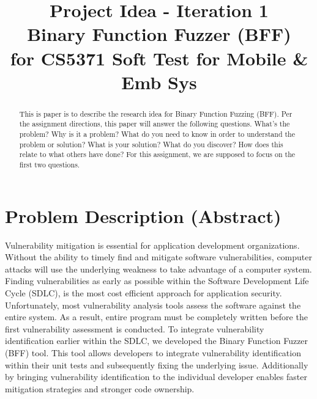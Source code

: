 \documentclass[conference]{IEEEtran}
\begin{document}
\title{Project Idea - Iteration 1\\
Binary Function Fuzzer (BFF) \\
for CS5371 Soft Test for Mobile \& Emb Sys}

\author{
}

\maketitle

\begin{abstract}
This is paper is to describe the research idea for Binary Function Fuzzing (BFF). Per the assignment directions, this paper will answer the following questions. What's the problem? Why is it a problem? What do you need to know in order to understand the problem or solution?  What is your solution?  What do you discover?  How does this relate to what others have done? For this assignment, we are supposed to focus on the first two questions.
\end{abstract}

\IEEEpeerreviewmaketitle

\section{Problem Description (Abstract)}
Vulnerability mitigation is essential for application development organizations. Without the ability to timely find and mitigate software vulnerabilities, computer attacks will use the underlying weakness to take advantage of a computer system. Finding vulnerabilities as early as possible within the Software Development Life Cycle (SDLC), is the most cost efficient approach for application security. Unfortunately, most vulnerability analysis tools assess the software against the entire system. As a result, entire program must be completely written before the first vulnerability assessment is conducted. To integrate vulnerability identification earlier within the SDLC, we developed the Binary Function Fuzzer (BFF) tool. This tool allows developers to integrate vulnerability identification within their unit tests and subsequently fixing the underlying issue. Additionally by bringing vulnerability identification to the individual developer enables faster mitigation strategies and stronger code ownership. 
\end{document}
